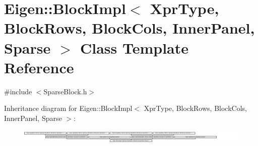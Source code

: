 \hypertarget{class_eigen_1_1_block_impl_3_01_xpr_type_00_01_block_rows_00_01_block_cols_00_01_inner_panel_00_01_sparse_01_4}{}\section{Eigen\+:\+:Block\+Impl$<$ Xpr\+Type, Block\+Rows, Block\+Cols, Inner\+Panel, Sparse $>$ Class Template Reference}
\label{class_eigen_1_1_block_impl_3_01_xpr_type_00_01_block_rows_00_01_block_cols_00_01_inner_panel_00_01_sparse_01_4}


{\ttfamily \#include $<$Sparse\+Block.\+h$>$}

Inheritance diagram for Eigen\+:\+:Block\+Impl$<$ Xpr\+Type, Block\+Rows, Block\+Cols, Inner\+Panel, Sparse $>$\+:\begin{figure}[H]
\begin{center}
\leavevmode
\includegraphics[height=0.680162cm]{class_eigen_1_1_block_impl_3_01_xpr_type_00_01_block_rows_00_01_block_cols_00_01_inner_panel_00_01_sparse_01_4}
\end{center}
\end{figure}
